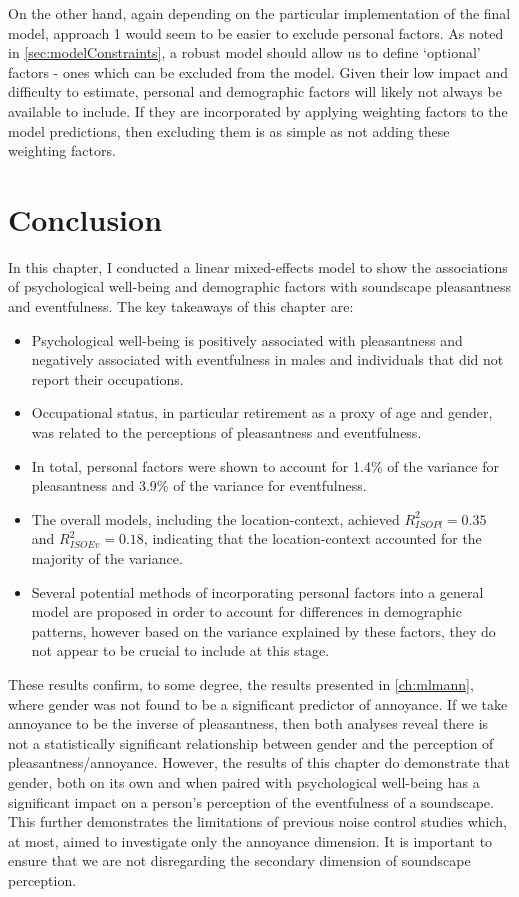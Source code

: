 On the other hand, again depending on the particular implementation of the final model, approach 1 would seem to be easier to exclude personal factors. As noted in \cref{sec:modelConstraints}, a robust model should allow us to define `optional' factors - ones which can be excluded from the model. Given their low impact and difficulty to estimate, personal and demographic factors will likely not always be available to include. If they are incorporated by applying weighting factors to the model predictions, then excluding them is as simple as not adding these weighting factors. 

\section{Conclusion}
In this chapter, I conducted a linear mixed-effects model to show the associations of psychological well-being and demographic factors with soundscape pleasantness and eventfulness. The key takeaways of this chapter are:

\begin{itemize}
  \item Psychological well-being is positively associated with pleasantness and negatively associated with eventfulness in males and individuals that did not report their occupations.
  \item Occupational status, in particular retirement as a proxy of age and gender, was related to the perceptions of pleasantness and eventfulness.
  \item In total, personal factors were shown to account for 1.4\% of the variance for pleasantness and 3.9\% of the variance for eventfulness.
  \item The overall models, including the location-context, achieved $R^2_{ISOPl}=0.35$ and $R^2_{ISOEv}=0.18$, indicating that the location-context accounted for the majority of the variance.
  \item Several potential methods of incorporating personal factors into a general model are proposed in order to account for differences in demographic patterns, however based on the variance explained by these factors, they do not appear to be crucial to include at this stage.
  
\end{itemize}
  
These results confirm, to some degree, the results presented in \cref{ch:mlmann}, where gender was not found to be a significant predictor of annoyance. If we take annoyance to be the inverse of pleasantness, then both analyses reveal there is not a statistically significant relationship between gender and the perception of pleasantness/annoyance. However, the results of this chapter do demonstrate that gender, both on its own and when paired with psychological well-being has a significant impact on a person's perception of the eventfulness of a soundscape. This further demonstrates the limitations of previous noise control studies which, at most, aimed to investigate only the annoyance dimension. It is important to ensure that we are not disregarding the secondary dimension of soundscape perception. 

